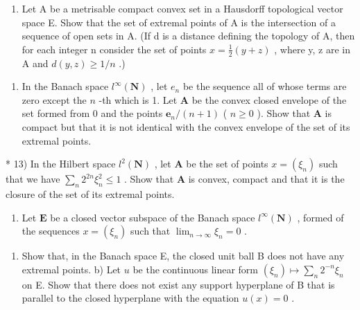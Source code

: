 \begin{enumerate}
\def\labelenumi{\alph{enumi})}
\setcounter{enumi}{1}
\tightlist
\item
  Let A be a metrisable compact convex set in a Hausdorff topological vector space E. Show that the set of extremal points of A is the intersection of a sequence of open sets in A. (If d is a distance defining the topology of A, then for each integer n consider the set of points \(x = \frac{1}{2}(y + z)\) , where y, z are in A and \(d(y, z) \geqslant 1/n\) .)
\end{enumerate}

\begin{enumerate}
\def\labelenumi{\arabic{enumi})}
\setcounter{enumi}{11}
\tightlist
\item
  In the Banach space \(l^{\infty}(\mathbf{N})\) , let \(e_n\) be the sequence all of whose terms are zero except the \(n\) -th which is 1. Let \(\mathbf{A}\) be the convex closed envelope of the set formed from 0 and the points \(\mathbf{e}_n / (n + 1)\) ( \(n \geqslant 0\) ). Show that \(\mathbf{A}\) is compact but that it is not identical with the convex envelope of the set of its extremal points.
\end{enumerate}

* 13) In the Hilbert space \(l^2(\mathbf{N})\) , let \(\mathbf{A}\) be the set of points \(x = (\xi_n)\) such that we have \(\sum_{n} 2^{2n}\xi_n^2 \leqslant 1\) . Show that \(\mathbf{A}\) is convex, compact and that it is the closure of the set of its extremal points.

\begin{enumerate}
\def\labelenumi{\arabic{enumi})}
\setcounter{enumi}{13}
\tightlist
\item
  Let \(\mathbf{E}\) be a closed vector subspace of the Banach space \(l^{\infty}(\mathbf{N})\) , formed of the sequences \(x = (\xi_n)\) such that \(\lim_{n\to \infty}\xi_n = 0\) .
\end{enumerate}

\begin{enumerate}
\def\labelenumi{\alph{enumi})}
\tightlist
\item
  Show that, in the Banach space E, the closed unit ball B does not have any extremal points. b) Let \(u\) be the continuous linear form \((\xi_n) \mapsto \sum_n 2^{-n}\xi_n\) on E. Show that there does not exist any support hyperplane of B that is parallel to the closed hyperplane with the equation \(u(x)=0\) .
\end{enumerate}

